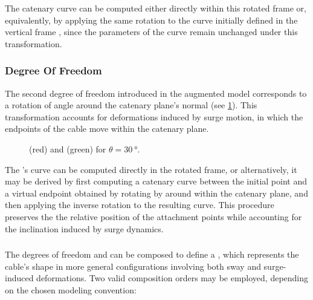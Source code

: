 The catenary curve can be computed either directly within this rotated frame \lframe{\gamma} or,
equivalently, by applying the same rotation to the curve initially defined in the vertical frame
, since the parameters of the curve remain unchanged under this transformation.

\subsubsection{\scal{\theta} Degree Of Freedom} \label{cm_acm_d_theta_degree_of_freedom}

The second degree of freedom introduced in the augmented model corresponds to a rotation of angle
\scal{\theta} around the catenary plane's normal (see \cref{cm_acm_d_tdof_schematic}). This
transformation accounts for deformations induced by surge motion, in which the endpoints of the
cable move within the catenary plane.

\begin{figure}
	\centering
	\caption{
		\gammamodel{} (red) and \thetagammamodel{} (green) for $\theta = \qty{30}{\degree}$.
	}
	\label{cm_acm_d_tdof_schematic}
\end{figure}

The \thetamodel{}'s curve can be computed directly in the rotated frame, or alternatively, it may
be derived by first computing a catenary curve between the initial point  and a virtual
endpoint obtained by rotating  by \scal{-\theta} around  within the catenary
plane, and then applying the inverse rotation to the resulting curve. This procedure preserves the
the relative position of the attachment points while accounting for the inclination induced by
surge dynamics.

\subsubsection{\thetagammamodeltitle{}}
\label{cm_acm_d_augmented_catenary_model}

The degrees of freedom \scal{\theta} and \scal{\gamma} can be composed to define a
\thetagammamodel{}, which represents the cable's shape in more general configurations involving
both sway and surge-induced deformations. Two valid composition orders may be employed, depending
on the chosen modeling convention:

